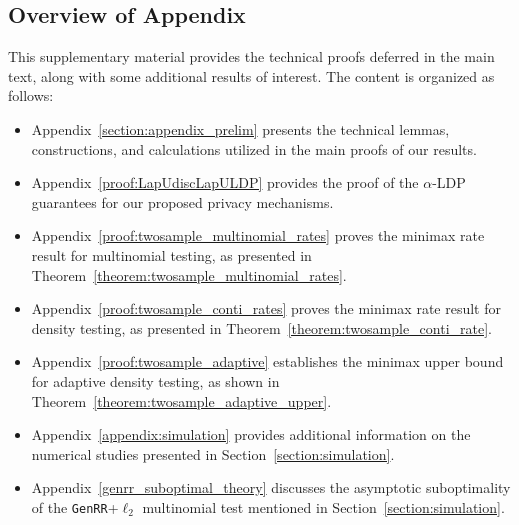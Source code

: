\documentclass[twoside,11pt]{article}
\newcommand{\privacyParameter}{\alpha} %
\begin{document}



\newpage

\begin{appendix}
	\section{Overview of Appendix}\label{appendix}%
	This supplementary material provides the technical proofs deferred in the main text, along with some additional results of interest. The content is organized as follows:
	
	\begin{itemize}
		\item Appendix~\ref{section:appendix_prelim} presents the technical lemmas, constructions, and calculations utilized in the main proofs of our results.
		\item Appendix~\ref{proof:LapUdiscLapULDP} provides the proof of the $\privacyParameter$-LDP guarantees for our proposed privacy mechanisms.
		\item Appendix~\ref{proof:twosample_multinomial_rates} proves the minimax rate result for multinomial testing, as presented in Theorem~\ref{theorem:twosample_multinomial_rates}.
		\item Appendix~\ref{proof:twosample_conti_rates} proves the minimax rate result for density testing, as presented in Theorem~\ref{theorem:twosample_conti_rate}.
		\item Appendix~\ref{proof:twosample_adaptive} establishes the minimax upper bound for adaptive density testing, as shown in Theorem~\ref{theorem:twosample_adaptive_upper}.
		\item Appendix~\ref{appendix:simulation} provides additional information on the numerical studies presented in Section~\ref{section:simulation}.
		\item Appendix~\ref{genrr_suboptimal_theory} discusses the asymptotic suboptimality of the \texttt{GenRR}+$\ell_2$ multinomial test mentioned in Section~\ref{section:simulation}.
	\end{itemize}
	

\end{appendix}
\end{document}
